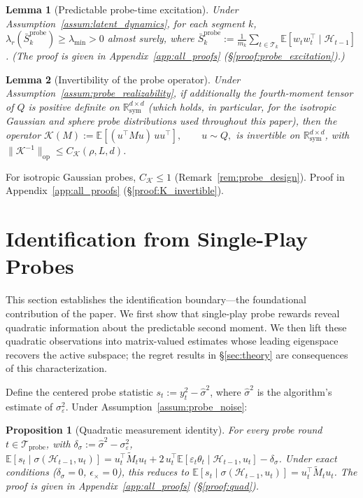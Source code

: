 \documentclass{article}
\newcommand{\R}{\mathbb{R}}
\newcommand{\E}{\mathbb{E}}
\newcommand{\op}{\mathrm{op}}
\newcommand{\cH}{\mathcal{H}}
\newcommand{\cT}{\mathcal{T}}
\newcommand{\cTprobe}{\mathcal{T}_{\mathrm{probe}}}
\newtheorem{lemma}{Lemma}
\newtheorem{proposition}{Proposition}
\begin{document}
\begin{lemma}[Predictable probe-time excitation]\label{lem:probe_excitation}
Under Assumption~\ref{assum:latent_dynamics}, for each segment $k$, $\lambda_r(\bar S_k^{\mathrm{probe}})\ge \lambda_{\min} > 0$ almost surely, where $\bar S_k^{\mathrm{probe}} := \frac{1}{m_k}\sum_{t\in \cT_k}\E[w_t w_t^\top \mid \cH_{t-1}]$. (The proof is given in Appendix~\ref{app:all_proofs} (\S\ref{proof:probe_excitation}).)
\end{lemma}

\begin{lemma}[Invertibility of the probe operator]\label{lem:K_invertible}
Under Assumption~\ref{assum:probe_realizability}, if additionally the fourth-moment tensor of $Q$ is positive definite on $\R_{\mathrm{sym}}^{d\times d}$ (which holds, in particular, for the isotropic Gaussian and sphere probe distributions used throughout this paper), then the operator $\mathcal K(M):=\E[(u^\top M u)\,uu^\top], \qquad u\sim Q,$ is invertible on $\R_{\mathrm{sym}}^{d\times d}$, with $\|\mathcal K^{-1}\|_{\op} \le C_{\mathcal K}(\rho, L, d)$.
\end{lemma}
For isotropic Gaussian probes, $C_{\mathcal K} \le 1$ (Remark~\ref{rem:probe_design}). Proof in Appendix~\ref{app:all_proofs} (\S\ref{proof:K_invertible}).
\section{Identification from Single-Play Probes}
\label{sec:identification}

This section establishes the identification boundary---the foundational contribution of the paper.
We first show that single-play probe rewards reveal quadratic information about the predictable second moment.
We then lift these quadratic observations into matrix-valued estimates whose leading eigenspace recovers the active subspace; the regret results in \S\ref{sec:theory} are consequences of this characterization.

Define the centered probe statistic $s_t := y_t^2 - \hat\sigma^2$, where $\hat\sigma^2$ is the algorithm's estimate of $\sigma_\varepsilon^2$.
Under Assumption~\ref{assum:probe_noise}:
\begin{proposition}[Quadratic measurement identity]
\label{prop:quad}
For every probe round $t \in \cTprobe$, with $\delta_\sigma := \hat\sigma^2 - \sigma_\varepsilon^2$,
$\E[s_t \mid \sigma(\cH_{t-1}, u_t)] = u_t^\top \widetilde{M}_t u_t + 2\,u_t^\top\E[\varepsilon_t\theta_t \mid \cH_{t-1}, u_t] - \delta_\sigma$.
Under exact conditions ($\delta_\sigma = 0$, $\epsilon_\times = 0$), this reduces to $\E[s_t \mid \sigma(\cH_{t-1}, u_t)] = u_t^\top \widetilde{M}_t u_t$.
The proof is given in Appendix~\ref{app:all_proofs} (\S\ref{proof:quad}).
\end{proposition} 
\end{document}
